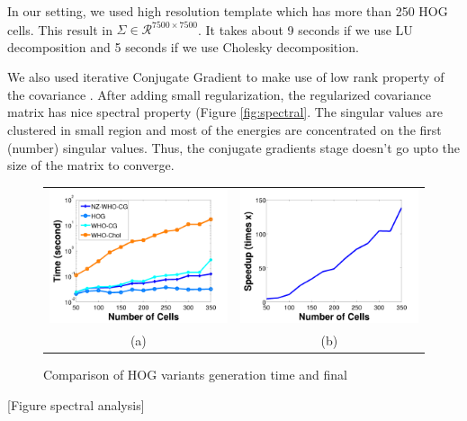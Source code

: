 \documentclass[10pt,twocolumn,letterpaper]{article}
\begin{document}
In our setting, we used high resolution template which has more than 250 HOG cells. This result in $\Sigma \in \mathcal{R}^{7500 \times 7500}$. It takes about 9 seconds if we use LU decomposition and 5 seconds if we use Cholesky decomposition.  %

We also used iterative Conjugate Gradient to make use of low rank property of the covariance \cite{Gharbi12}. After adding small regularization, the regularized covariance matrix has nice spectral property (Figure \ref{fig:spectral}. The singular values are clustered in small region and most of the energies are concentrated on the first (number) singular values. Thus, the conjugate gradients stage doesn't go upto the size of the matrix to converge.

\begin{figure}[t]
  \begin{center}
  \begin{tabular}{cc}
     \includegraphics[width=0.5\linewidth]{whotime} & 
     \includegraphics[width=0.5\linewidth]{speedup}\\
     (a) & (b) \\
 \end{tabular}
  \end{center}
  \caption{Comparison of HOG variants generation time and final }
  \label{fig:whotime}
\end{figure}
[Figure spectral analysis]
\end{document}
